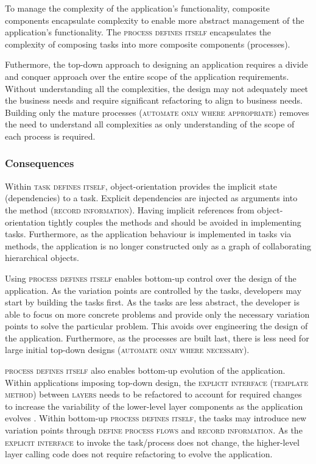 \documentclass[prodmode]{style/acmlarge}
\begin{document}
To manage the complexity of the application's functionality, composite
components encapsulate complexity to enable more abstract management of the
application's functionality.  The \textsc{process defines itself} encapsulates
the complexity of composing tasks into more composite components (processes).

Futhermore, the top-down approach to designing an application requires a divide
and conquer approach over the entire scope of the application requirements.
Without understanding all the complexities, the design may not adequately meet
the business needs and require significant refactoring to align to business
needs.  Building only the mature processes (\textsc{automate only where
appropriate}) removes the need to understand all complexities as only
understanding of the scope of each process is required.


\subsubsection*{Consequences}

Within \textsc{task defines itself}, object-orientation provides the implicit
state (dependencies) to a task.  Explicit dependencies are injected as arguments
into the method (\textsc{record information}).  Having implicit references from
object-orientation tightly couples the methods and should be avoided in
implementing tasks.  Furthermore, as the application behaviour is implemented in
tasks via methods, the application is no longer constructed only as a graph of
collaborating hierarchical objects.

Using \textsc{process defines itself} enables bottom-up control over the design
of the application.  As the variation points are controlled by the tasks,
developers may start by building the tasks first.  As the tasks are less
abstract, the developer is able to focus on more concrete problems and provide
only the necessary variation points to solve the particular problem.  This
avoids over engineering the design of the application.  Furthermore, as the
processes are built last, there is less need for large initial top-down designs
(\textsc{automate only where necessary}).

\textsc{process defines itself} also enables bottom-up evolution of the
application.  Within applications imposing top-down design, the
\textsc{explicit interface} (\textsc{template method}) between \textsc{layers}
needs to be refactored to account for required changes to increase the
variability of the lower-level layer components as the application evolves
\cite{ioc}.  Within bottom-up \textsc{process defines itself}, the tasks may
introduce new variation points through \textsc{define process flows} and
\textsc{record information}.  As the \textsc{explicit interface} to invoke the
task/process does not change, the higher-level layer calling code does not
require refactoring to evolve the application.
\end{document}
